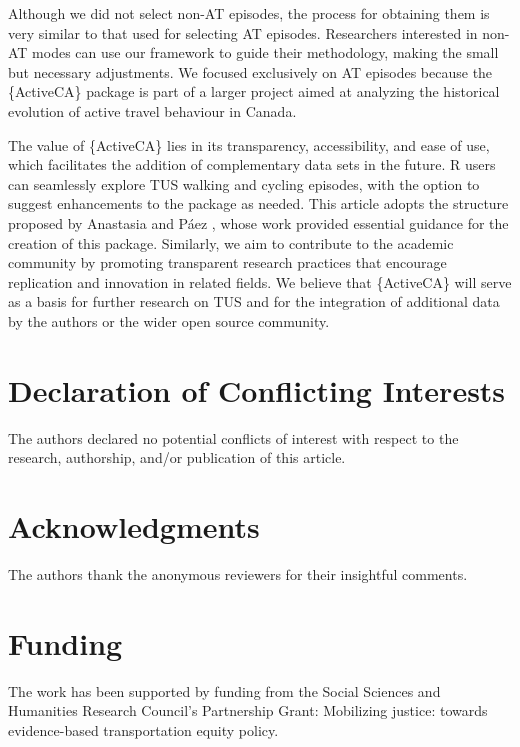 \documentclass[Royal,times,sageh]{sagej}
\begin{document}
Although we did not select non-AT episodes, the process for obtaining
them is very similar to that used for selecting AT episodes. Researchers
interested in non-AT modes can use our framework to guide their
methodology, making the small but necessary adjustments. We focused
exclusively on AT episodes because the \{ActiveCA\} package is part of a
larger project aimed at analyzing the historical evolution of active
travel behaviour in Canada.

The value of \{ActiveCA\} lies in its transparency, accessibility, and
ease of use, which facilitates the addition of complementary data sets
in the future. R users can seamlessly explore TUS walking and cycling
episodes, with the option to suggest enhancements to the package as
needed. This article adopts the structure proposed by Anastasia and Páez
\citeyearpar{soukhov2023}, whose work provided essential guidance for
the creation of this package. Similarly, we aim to contribute to the
academic community by promoting transparent research practices that
encourage replication and innovation in related fields. We believe that
\{ActiveCA\} will serve as a basis for further research on TUS and for
the integration of additional data by the authors or the wider open
source community.

\section{Declaration of Conflicting
Interests}\label{declaration-of-conflicting-interests}

The authors declared no potential conflicts of interest with respect to
the research, authorship, and/or publication of this article.

\section{Acknowledgments}\label{acknowledgments}

The authors thank the anonymous reviewers for their insightful comments.

\section{Funding}\label{funding}

The work has been supported by funding from the Social Sciences and
Humanities Research Council's Partnership Grant: Mobilizing justice:
towards evidence-based transportation equity policy.
\end{document}
